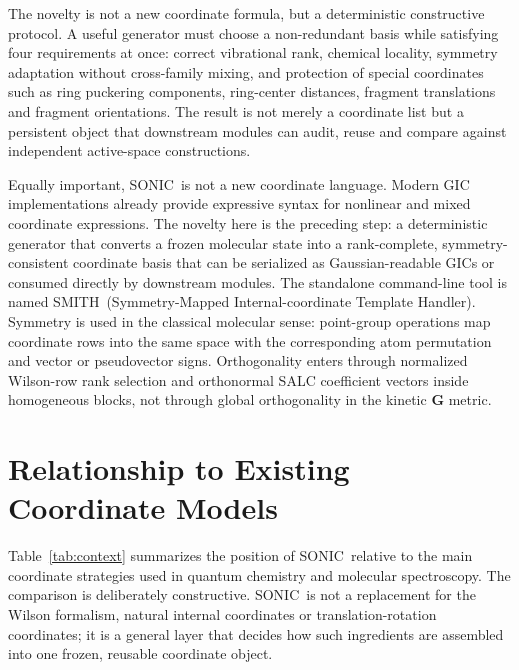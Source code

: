 \documentclass[journal=jctcce,manuscript=article,layout=traditional]{achemso}
\newcommand{\SONIC}{SONIC}
\newcommand{\SMITH}{\textsc{SMITH}}
\newcommand{\Gmat}{\mathbf{G}}
\theoremstyle{definition}
\begin{document}
The novelty is not a new coordinate formula, but a deterministic constructive
protocol.  A useful generator must choose a non-redundant basis while satisfying
four requirements at once: correct vibrational rank, chemical locality,
symmetry adaptation without cross-family mixing, and protection of special
coordinates such as ring puckering components, ring-center distances, fragment
translations and fragment orientations.  The result is not merely a coordinate
list but a persistent object that downstream modules can audit, reuse and
compare against independent active-space constructions.

Equally important, \SONIC\ is not a new coordinate language.  Modern GIC
implementations already provide expressive syntax for nonlinear and mixed
coordinate expressions.  The novelty here is the preceding step: a
deterministic generator that converts a frozen molecular state into a
rank-complete, symmetry-consistent coordinate basis that can be serialized as
Gaussian-readable GICs or consumed directly by downstream modules.  The
standalone command-line tool is named \SMITH\ (Symmetry-Mapped
Internal-coordinate Template Handler).  Symmetry is used in the classical molecular sense: point-group
operations map coordinate rows into the same space with the corresponding atom
permutation and vector or pseudovector signs.  Orthogonality enters through
normalized Wilson-row rank selection and orthonormal SALC coefficient vectors
inside homogeneous blocks, not through global orthogonality in the kinetic
\(\Gmat\) metric.

\section{Relationship to Existing Coordinate Models}

Table~\ref{tab:context} summarizes the position of \SONIC\ relative to the main
coordinate strategies used in quantum chemistry and molecular spectroscopy.
The comparison is deliberately constructive.  \SONIC\ is not a replacement for
the Wilson formalism, natural internal coordinates or translation-rotation
coordinates; it is a general layer that decides how such ingredients are
assembled into one frozen, reusable coordinate object.
\end{document}

